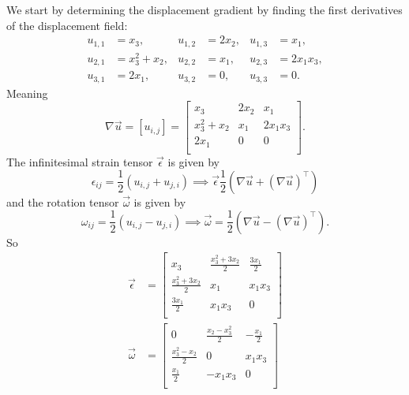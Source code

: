   \begin{derivation}
    We start by determining the displacement gradient by finding the first derivatives of the displacement field:
    \begin{align*}
      u_{1,1} &= x_3, & u_{1,2} &= 2x_2, & u_{1,3} &= x_1, \\
      u_{2,1} &= x_3^2 + x_2, & u_{2,2} &= x_1, & u_{2,3} &= 2x_1 x_3, \\
      u_{3,1} &= 2x_1, & u_{3,2} &= 0, & u_{3,3} &= 0
    .\end{align*}
    Meaning
    \begin{equation*}
      \nabla \Vec{u} = [u_{i,j}] = \begin{bmatrix}
        x_3 & 2x_2 & x_1\\
      x_3^2 + x_2 & x_1 & 2x_1 x_3\\
      2x_1 & 0 & 0\\
      \end{bmatrix}
    .\end{equation*}
    The infinitesimal strain tensor $\Vec{\epsilon}$ is given by
    \begin{equation*}
      \epsilon_{ij} = \frac{1}{2} \left( u_{i,j} + u_{j,i} \right) \implies \Vec{\epsilon} \frac{1}{2} \left( \nabla  \Vec{u} + \left( \nabla \Vec{u} \right)^{\intercal} \right)
    \end{equation*}
    and the rotation tensor $\Vec{\omega}$ is given by
    \begin{equation*}
      \omega_{ij}  = \frac{1}{2} \left( u_{i,j} - u_{j,i} \right) \implies \Vec{\omega} = \frac{1}{2} \left( \nabla  \Vec{u} - \left( \nabla \Vec{u} \right)^{\intercal} \right)
    .\end{equation*}
    So
    \begin{align*}
      \Vec{\epsilon} &= \begin{bmatrix}
        x_3 & \frac{x_3^2 + 3x_2}{2} & \frac{3x_1}{2}\\
      \frac{x_3^2 + 3x_2}{2} & x_1 & x_1x_3\\
      \frac{3x_1}{2} & x_1x_3 & 0\\
      \end{bmatrix} \\
      \Vec{\omega} &= \begin{bmatrix}
        0 & \frac{x_2 - x_3^2}{2} & - \frac{x_1}{2}\\
      \frac{x_3^2 - x_2}{2} & 0 & x_1x_3\\
      \frac{x_1}{2} & -x_1x_3 & 0\\

\end{bmatrix}
\end{align*}
\end{derivation}
